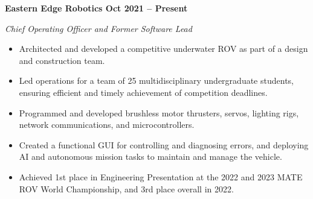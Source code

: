 \vspace{0.1cm}
\textbf{Eastern Edge Robotics \hfill Oct 2021 -- Present} \par
\textit{Chief Operating Officer and Former Software Lead} \par
\begin{itemize}
	\item Architected and developed a competitive underwater ROV as part of a design and construction team.
  \item Led operations for a team of 25 multidisciplinary undergraduate students, ensuring efficient and timely achievement of competition deadlines.
  \item Programmed and developed brushless motor thrusters, servos, lighting rigs, network communications, and microcontrollers.
  \item Created a functional GUI for controlling and diagnosing errors, and deploying AI and autonomous mission tasks to maintain and manage the vehicle.
  \item Achieved 1st place in Engineering Presentation at the 2022 and 2023 MATE ROV World Championship, and 3rd place overall in 2022.
\end{itemize} \par